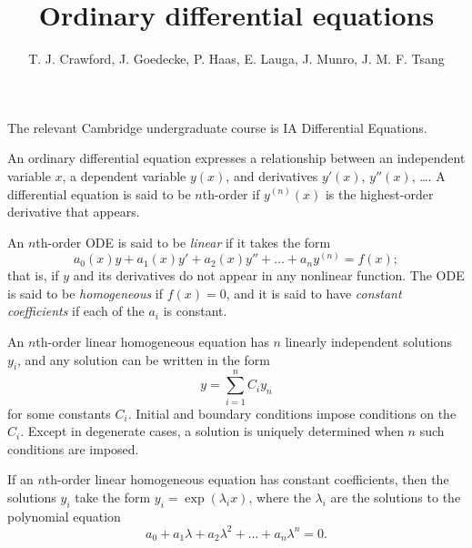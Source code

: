 \documentclass{article}
\title{Ordinary differential equations}
\author{T. J. Crawford, J. Goedecke, P. Haas, E. Lauga, J. Munro, J. M. F. Tsang}
\begin{document}
\maketitle

The relevant Cambridge undergraduate course is IA Differential Equations.

An ordinary differential equation expresses a relationship between an
independent variable $x$, a dependent variable $y(x)$, and derivatives $y'(x)$,
$y''(x)$, \dots. A differential equation is said to be $n$th-order if
$y^{(n)}(x)$ is the highest-order derivative that appears.

An $n$th-order ODE is said to be \textit{linear} if it takes the form
$$ a_0(x) y + a_1(x) y' + a_2(x) y'' + \dots + a_n y^{(n)} = f(x); $$ 
that is, if $y$ and its derivatives do not appear in any nonlinear function.
The ODE is said to be \textit{homogeneous} if $f(x) = 0$, and it is said to have
\textit{constant coefficients} if each of the $a_i$ is constant. 

An $n$th-order linear homogeneous equation has $n$ linearly independent
solutions $y_i$, and any solution can be written in the form
$$ y = \sum_{i=1}^n C_i y_n $$
for some constants $C_i$. Initial and boundary conditions impose conditions on
the $C_i$. Except in degenerate cases, a solution is uniquely determined when
$n$ such conditions are imposed. 

If an $n$th-order linear homogeneous equation has constant coefficients, then
the solutions $y_i$ take the form $y_i = \exp(\lambda_i x)$, where the
$\lambda_i$ are the solutions to the polynomial equation
$$ a_0 + a_1 \lambda + a_2 \lambda^2 + \dots + a_n \lambda^n = 0. $$
\end{document}
